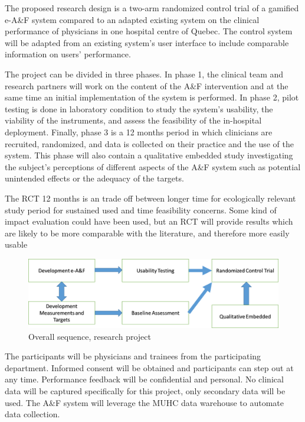 The proposed research design is a two-arm randomized control trial of a gamified e-A\&F system compared to an adapted existing system on the clinical performance of physicians in one hospital centre of Quebec. The control system will be adapted from an existing system’s user interface to include comparable information on users’ performance.

The project can be divided in three phases. In phase 1, the clinical team and research partners will work on the content of the A\&F intervention and at the same time an initial implementation of the system is performed. In phase 2, pilot testing is done in laboratory condition to study the system’s usability, the viability of the instruments, and assess the feasibility of the in-hospital deployment. Finally, phase 3 is a 12 months period in which clinicians are recruited, randomized, and data is collected on their practice and the use of the system. This phase will also contain a qualitative embedded study investigating the subject’s perceptions of different aspects of the A\&F system such as potential unintended effects or the adequacy of the targets.

The RCT 12 months is an trade off between longer time for ecologically relevant study period for sustained used and time feasibility concerns.
Some kind of impact evaluation could have been used, but an RCT will provide results which are likely to be more comparable with the literature, and therefore more easily usable 
\begin{figure}[h]
    \centering
    \includegraphics[width=\textwidth]{img/overall_sequence.png}
    \caption{Overall sequence, research project}
    \label{fig:ove_seq}
\end{figure}

The participants will be physicians and trainees from the participating department. Informed consent will be obtained and participants can step out at any time. Performance feedback will be confidential and personal. No clinical data will be captured specifically for this project, only secondary data will be used. The A\&F system will leverage the MUHC data warehouse to automate data collection.

